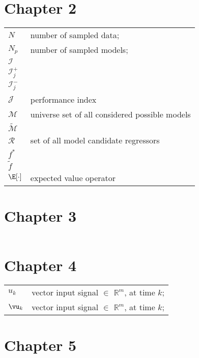 \section*{Chapter 2}
      \footnotesize
      \begin{tabular}{lp{11cm}}
            $N$            & number of sampled data;\\
            $N_{p}$            & number of sampled models;\\
            $\mathcal{I}$ & \\
            $\mathcal{I}_{j}^+$ & \\
            $\mathcal{I}_{j}^-$ & \\
             $\mathcal{J}$ & performance index \\
             $\mathscr{M}$ & universe set of all considered possible models \\
             $\tilde{\mathscr{M}}$ & \\
             $\mathscr{R}$ & set of all model candidate regressors \\
             $f^*$ & \\
             $\tilde{f}$ & \\
             $\E[\cdot]$ & expected value operator \\
      \end{tabular}

\section*{Chapter 3}
      \footnotesize
      \begin{tabular}{p{4cm}p{10.5cm}}
      \end{tabular}

\section*{Chapter 4}
      \footnotesize
      \begin{tabular}{lp{10cm}}
            $u_{k}$                  & vector input signal $\in$ $\mathbb{R}^{m}$, at time $k$; \\
            $\vu_{k}$                  & vector input signal $\in$ $\mathbb{R}^{m}$, at time $k$; \\
      \end{tabular}

\section*{Chapter 5}
      \footnotesize
      \begin{tabular}{lp{11cm}}
      \end{tabular}

